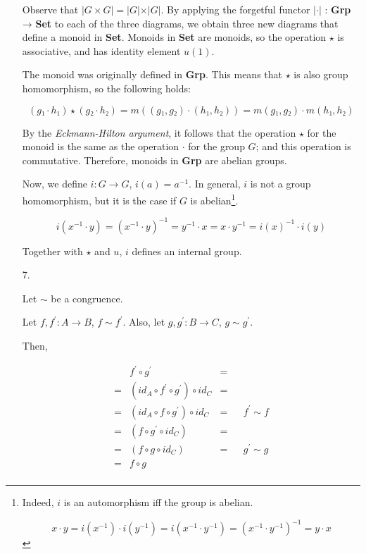 \documentclass{article}
\begin{document}
\begin{enumerate}
    Observe that $\vert G \times G \vert = \vert G \vert \times \vert G \vert$.
    By applying the forgetful functor $\vert · \vert$ : {\bf Grp} → {\bf Set} to each of
    the three diagrams, we obtain three new diagrams that define a monoid in {\bf Set}.
    Monoids in {\bf Set} are monoids, so the operation $\star$ is associative, and has identity
    element $u(1)$.

    The monoid was originally defined in {\bf Grp}. This means that
    $\star$ is also group homomorphism, so the following holds:

        $$(g₁·h₁) \star (g₂·h₂) = m((g₁,g₂)·(h₁,h₂)) = m(g₁,g₂)·m(h₁,h₂)$$

    By the {\em Eckmann-Hilton argument}, it follows that the operation
    $\star$ for the monoid is the same as the operation $·$ for the
    group $G$; and this operation is commutative. Therefore,
    monoids in {\bf Grp} are abelian groups.

    Now, we define $i : G → G$, $i(a) = a^{-1}$.
    In general, $i$ is not a group homomorphism, but it is the case if
    $G$ is abelian\footnote{Indeed, $i$ is an automorphism iff the
      group is abelian.

      $$x \cdot y = i(x^{-1}) \cdot i(y^{-1}) = i(x^{-1}\cdot y^{-1}) = (x^{-1} \cdot y^{-1})^{-1} = y\cdot x$$
    }.

    $$i(x^{-1}\cdot y) = (x^{-1}\cdot y)^{-1} = y^{-1} \cdot x = x \cdot y^{-1} = i(x)^{-1} \cdot i(y)$$

    Together with $\star$ and $u$, $i$ defines an internal group.
      

  \item[7.]

    Let $\sim$ be a congruence.

    Let $f, f^\prime : A → B$, $f \sim f^\prime$. Also, let $g, g^\prime : B → C$,
    $g \sim g^\prime$.

    Then,

    \begin{align*}
        & f^\prime \circ g^\prime                          & = \\
      = & (id_A \circ f^\prime \circ g^\prime) \circ id_C   & =  \\ 
      = & (id_A \circ f \circ g^\prime) \circ id_C        & = &&\text{$f^\prime \sim f$} \\ 
      = & (f \circ g^\prime \circ id_C)                   & = \\
      = & (f \circ g \circ id_C)                        & = &&\text{$g^\prime \sim g$} \\ 
      = & f \circ g                                     & \\ 
    \end{align*}


\end{enumerate}
\end{document}
